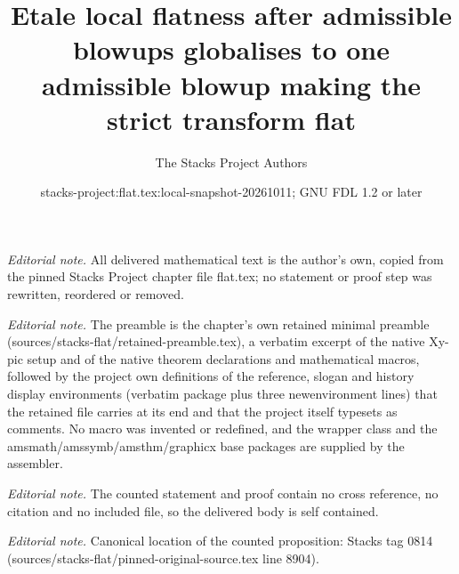 \documentclass[10pt,a4paper]{amsart}
\title{Etale local flatness after admissible blowups globalises to one admissible blowup making the strict transform flat}
\author{The Stacks Project Authors}
\date{stacks-project:flat.tex:local-snapshot-20261011; GNU FDL 1.2 or later}
\theoremstyle{plain}
\theoremstyle{definition}
\theoremstyle{remark}
\numberwithin{equation}{subsection}
\begin{document}
\maketitle
\noindent\textit{Editorial note.} All delivered mathematical text is the author's own, copied from the pinned Stacks Project chapter file flat.tex; no statement or proof step was rewritten, reordered or removed.\par\medskip
\noindent\textit{Editorial note.} The preamble is the chapter's own retained minimal preamble (sources/stacks-flat/retained-preamble.tex), a verbatim excerpt of the native Xy-pic setup and of the native theorem declarations and mathematical macros, followed by the project own definitions of the reference, slogan and history display environments (verbatim package plus three newenvironment lines) that the retained file carries at its end and that the project itself typesets as comments. No macro was invented or redefined, and the wrapper class and the amsmath/amssymb/amsthm/graphicx base packages are supplied by the assembler.\par\medskip
\noindent\textit{Editorial note.} The counted statement and proof contain no cross reference, no citation and no included file, so the delivered body is self contained.\par\medskip
\noindent\textit{Editorial note.} Canonical location of the counted proposition: Stacks tag 0814 (sources/stacks-flat/pinned-original-source.tex line 8904).\par\medskip
\end{document}

